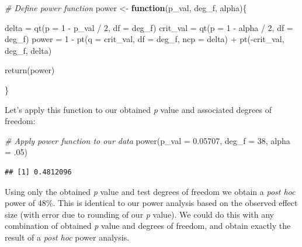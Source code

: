 \documentclass[
]{book}
\newenvironment{Shaded}{\begin{snugshade}}{\end{snugshade}}
\newcommand{\AttributeTok}[1]{\textcolor[rgb]{0.77,0.63,0.00}{#1}}
\newcommand{\CommentTok}[1]{\textcolor[rgb]{0.56,0.35,0.01}{\textit{#1}}}
\newcommand{\ControlFlowTok}[1]{\textcolor[rgb]{0.13,0.29,0.53}{\textbf{#1}}}
\newcommand{\DecValTok}[1]{\textcolor[rgb]{0.00,0.00,0.81}{#1}}
\newcommand{\FloatTok}[1]{\textcolor[rgb]{0.00,0.00,0.81}{#1}}
\newcommand{\FunctionTok}[1]{\textcolor[rgb]{0.00,0.00,0.00}{#1}}
\newcommand{\NormalTok}[1]{#1}
\newcommand{\OtherTok}[1]{\textcolor[rgb]{0.56,0.35,0.01}{#1}}
\newcommand{\SpecialCharTok}[1]{\textcolor[rgb]{0.00,0.00,0.00}{#1}}
\begin{document}
\begin{Shaded}
\begin{Highlighting}[]
\CommentTok{\# Define power function}
\NormalTok{power }\OtherTok{\textless{}{-}} \ControlFlowTok{function}\NormalTok{(p\_val, deg\_f, alpha)\{}

\NormalTok{  delta }\OtherTok{=} \FunctionTok{qt}\NormalTok{(}\AttributeTok{p =} \DecValTok{1} \SpecialCharTok{{-}}\NormalTok{ p\_val }\SpecialCharTok{/} \DecValTok{2}\NormalTok{, }\AttributeTok{df =}\NormalTok{ deg\_f)}
\NormalTok{  crit\_val }\OtherTok{=} \FunctionTok{qt}\NormalTok{(}\AttributeTok{p =} \DecValTok{1} \SpecialCharTok{{-}}\NormalTok{ alpha }\SpecialCharTok{/} \DecValTok{2}\NormalTok{, }\AttributeTok{df =}\NormalTok{ deg\_f)}
\NormalTok{  power }\OtherTok{=} \DecValTok{1} \SpecialCharTok{{-}} \FunctionTok{pt}\NormalTok{(}\AttributeTok{q =}\NormalTok{ crit\_val, }\AttributeTok{df =}\NormalTok{ deg\_f, }\AttributeTok{ncp =}\NormalTok{ delta) }\SpecialCharTok{+} \FunctionTok{pt}\NormalTok{(}\SpecialCharTok{{-}}\NormalTok{crit\_val, deg\_f, delta)}
  
  \FunctionTok{return}\NormalTok{(power)}

\NormalTok{\}}
\end{Highlighting}
\end{Shaded}

Let's apply this function to our obtained \emph{p} value and associated degrees of freedom:

\begin{Shaded}
\begin{Highlighting}[]
\CommentTok{\# Apply power function to our data}
\FunctionTok{power}\NormalTok{(}\AttributeTok{p\_val =} \FloatTok{0.05707}\NormalTok{, }\AttributeTok{deg\_f =} \DecValTok{38}\NormalTok{, }\AttributeTok{alpha =}\NormalTok{ .}\DecValTok{05}\NormalTok{)}
\end{Highlighting}
\end{Shaded}

\begin{verbatim}
## [1] 0.4812096
\end{verbatim}

Using only the obtained \emph{p} value and test degrees of freedom we obtain a \emph{post hoc} power of 48\%. This is identical to our power analysis based on the observed effect size (with error due to rounding of our \emph{p} value). We could do this with any combination of obtained \emph{p} value and degrees of freedom, and obtain exactly the result of a \emph{post hoc} power analysis.
\end{document}
